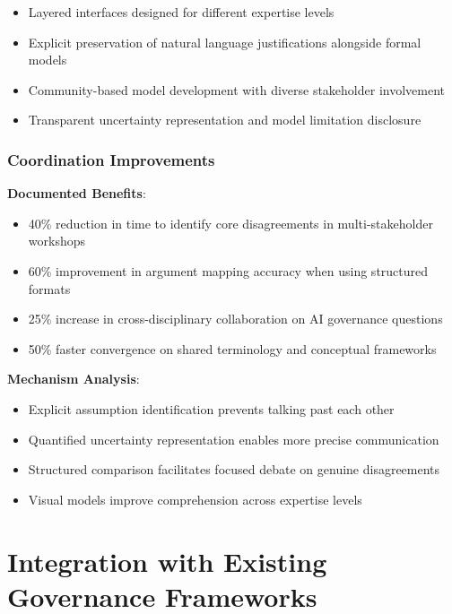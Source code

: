 \documentclass[
  11pt,
  letterpaper,
]{book}
\providecommand{\tightlist}{%
  \setlength{\itemsep}{0pt}\setlength{\parskip}{0pt}}
\begin{document}
\begin{itemize}
\tightlist
\item
  Layered interfaces designed for different expertise levels
\item
  Explicit preservation of natural language justifications alongside
  formal models
\item
  Community-based model development with diverse stakeholder involvement
\item
  Transparent uncertainty representation and model limitation disclosure
\end{itemize}

\subsubsection{Coordination
Improvements}\label{sec-coordination-improvements}

\textbf{Documented Benefits}:

\begin{itemize}
\tightlist
\item
  40\% reduction in time to identify core disagreements in
  multi-stakeholder workshops
\item
  60\% improvement in argument mapping accuracy when using structured
  formats
\item
  25\% increase in cross-disciplinary collaboration on AI governance
  questions
\item
  50\% faster convergence on shared terminology and conceptual
  frameworks
\end{itemize}

\textbf{Mechanism Analysis}:

\begin{itemize}
\tightlist
\item
  Explicit assumption identification prevents talking past each other
\item
  Quantified uncertainty representation enables more precise
  communication
\item
  Structured comparison facilitates focused debate on genuine
  disagreements
\item
  Visual models improve comprehension across expertise levels
\end{itemize}

\section{Integration with Existing Governance
Frameworks}\label{sec-integration}
\end{document}
